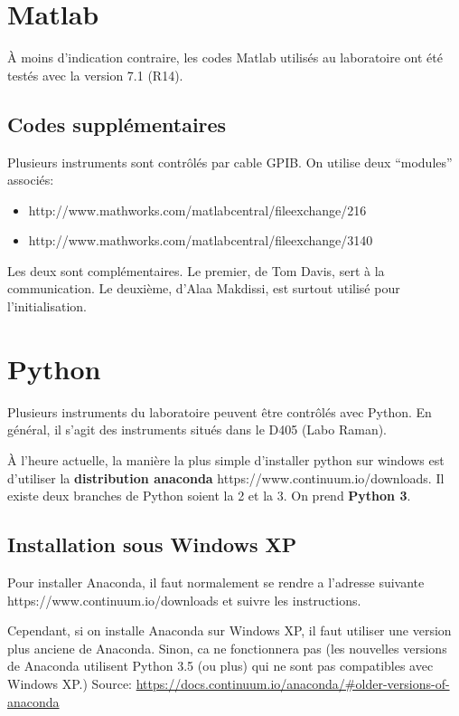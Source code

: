 \documentclass[11pt,francais]{book} %
\begin{document}
\section{Matlab}%

À moins d'indication contraire, les codes Matlab utilisés au laboratoire ont été testés avec la version 7.1 (R14).

\subsection{Codes supplémentaires}

Plusieurs instruments sont contrôlés par cable GPIB.
On utilise deux ``modules'' associés:
\begin{itemize}
\item http://www.mathworks.com/matlabcentral/fileexchange/216
\item http://www.mathworks.com/matlabcentral/fileexchange/3140
\label{tableModulesGPIBMatlab}
\end{itemize}
Les deux sont complémentaires.
Le premier, de Tom Davis, sert à la communication.
Le deuxième, d'Alaa Makdissi, est surtout utilisé pour l'initialisation.

\section{Python}

Plusieurs instruments du laboratoire peuvent être contrôlés avec Python.
En général, il s'agit des instruments situés dans le D405 (Labo Raman).

À l'heure actuelle, la manière la plus simple d'installer python sur windows est d'utiliser la {\bf distribution anaconda} https://www.continuum.io/downloads.
Il existe deux branches de Python soient la 2 et la 3. On prend {\bf Python 3}.

\subsection{Installation sous Windows XP}

	Pour installer Anaconda, il faut normalement se rendre a l'adresse suivante
	https://www.continuum.io/downloads
	et suivre les instructions.

	Cependant, si on installe Anaconda sur Windows XP, il faut utiliser une version plus anciene de Anaconda. 
	Sinon, ca ne fonctionnera pas (les nouvelles versions de Anaconda utilisent Python 3.5 (ou plus) qui ne sont pas compatibles avec Windows XP.)
	Source: \url{https://docs.continuum.io/anaconda/#older-versions-of-anaconda}
\end{document}
